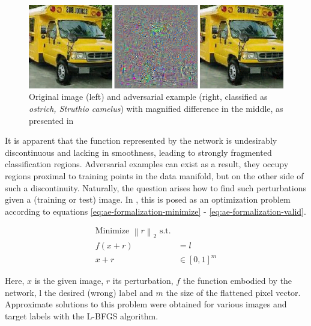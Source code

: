 \documentclass[11pt, a4paper]{article}
\newcommand\brackets[1]{\left[#1\right]}
\renewcommand{\vec}[1]{\underline{#1}}
\newcommand{\mat}[1]{\underline{\underline{#1}}}
\newcommand{\norm}[1]{\left\lVert#1\right\rVert}
\begin{document}
\begin{figure}[htp]
\centering
	\includegraphics[width=\textwidth]{images/intruiging_properties_ae.png}
	\caption{Original image (left) and adversarial example (right, classified as \emph{ostrich, Struthio
camelus}) with magnified difference in the middle, as presented in \cite{intriguing-properties-of-neural-networks}}
	\label{fig:intriguing-properties-ae}
\end{figure}

It is apparent that the function represented by the network is undesirably discontinuous and lacking in smoothness, leading to strongly fragmented classification regions. Adversarial examples can exist as a result, they occupy regions proximal to training points in the data manifold, but on the other side of such a discontinuity. Naturally, the question arises how to find such perturbations given a (training or test) image. In \cite{intriguing-properties-of-neural-networks}, this is posed as an optimization problem according to equations \eqref{eq:ae-formalization-minimize} - \eqref{eq:ae-formalization-valid}.

\begin{align}
	\text{Minimize $\norm{r}_2$ s.t.} \label{eq:ae-formalization-minimize} \\
	f(x + r) &= l \label{eq:ae-formalization-label} \\
	x + r &\in \brackets{0, 1}^m \label{eq:ae-formalization-valid}
\end{align}

Here, $x$ is the given image, $r$ its perturbation, $f$ the function embodied by the network, l the desired (wrong) label and $m$ the size of the flattened pixel vector. Approximate solutions to this problem were obtained for various images and target labels with the L-BFGS algorithm.
\end{document}
